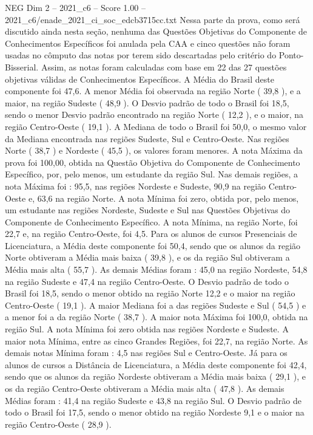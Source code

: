 \begin{textsample}{NEG Dim 2 – 2021\_c6 – Score 1.00 – 2021\_c6/enade\_2021\_ci\_soc\_edcb3715cc.txt}
Nessa parte da prova, como será discutido ainda nesta seção, nenhuma das Questões Objetivas do Componente de Conhecimentos Específicos foi anulada pela CAA e cinco questões não foram usadas no cômputo das notas por terem sido descartadas pelo critério do Ponto-Bisserial.
Assim, as notas foram calculadas com base em 22 das 27 questões objetivas válidas de Conhecimentos Específicos.
A Média do Brasil deste componente foi 47,6.
A menor Média foi observada na região Norte ( 39,8 ), e a maior, na região Sudeste ( 48,9 ).
O Desvio padrão de todo o Brasil foi 18,5, sendo o menor Desvio padrão encontrado na região Norte ( 12,2 ), e o maior, na região Centro-Oeste ( 19,1 ).
A Mediana de todo o Brasil foi 50,0, o mesmo valor da Mediana encontrada nas regiões Sudeste, Sul e Centro-Oeste.
Nas regiões Norte ( 38,7 ) e Nordeste ( 45,5 ), os valores foram menores.
A nota Máxima da prova foi 100,00, obtida na Questão Objetiva do Componente de Conhecimento Específico, por, pelo menos, um estudante da região Sul.
Nas demais regiões, a nota Máxima foi : 95,5, nas regiões Nordeste e Sudeste, 90,9 na região Centro-Oeste e, 63,6 na região Norte.
A nota Mínima foi zero, obtida por, pelo menos, um estudante nas regiões Nordeste, Sudeste e Sul nas Questões Objetivas do Componente de Conhecimento Específico.
A nota Mínima, na região Norte, foi 22,7 e, na região Centro-Oeste, foi 4,5.
Para os alunos de cursos Presenciais de Licenciatura, a Média deste componente foi 50,4, sendo que os alunos da região Norte obtiveram a Média mais baixa ( 39,8 ), e os da região Sul obtiveram a Média mais alta ( 55,7 ).
As demais Médias foram : 45,0 na região Nordeste, 54,8 na região Sudeste e 47,4 na região Centro-Oeste.
O Desvio padrão de todo o Brasil foi 18,5, sendo o menor obtido na região Norte 12,2 e o maior na região Centro-Oeste ( 19,1 ).
A maior Mediana foi a das regiões Sudeste e Sul ( 54,5 ) e a menor foi a da região Norte ( 38,7 ).
A maior nota Máxima foi 100,0, obtida na região Sul.
A nota Mínima foi zero obtida nas regiões Nordeste e Sudeste.
A maior nota Mínima, entre as cinco Grandes Regiões, foi 22,7, na região Norte.
As demais notas Mínima foram : 4,5 nas regiões Sul e Centro-Oeste.
Já para os alunos de cursos a Distância de Licenciatura, a Média deste componente foi 42,4, sendo que os alunos da região Nordeste obtiveram a Média mais baixa ( 29,1 ), e os da região Centro-Oeste obtiveram a Média mais alta ( 47,8 ).
As demais Médias foram : 41,4 na região Sudeste e 43,8 na região Sul.
O Desvio padrão de todo o Brasil foi 17,5, sendo o menor obtido na região Nordeste 9,1 e o maior na região Centro-Oeste ( 28,9 ).

\end{textsample}
